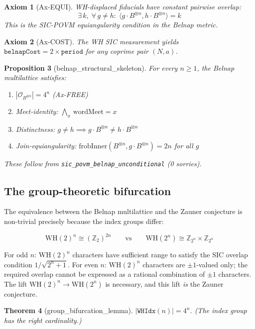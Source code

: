 \documentclass[12pt,a4paper]{article}
\newtheorem{theorem}{Theorem}[section]
\newtheorem{proposition}[theorem]{Proposition}
\newtheorem{axiom_env}[theorem]{Axiom}
\newcommand{\WH}{\mathrm{WH}}
\begin{document}
\begin{axiom_env}[Ax-EQUI]
WH-displaced fiducials have constant pairwise overlap:
\[
\exists\, k,\; \forall\, g \neq h:\; \langle g \cdot B^{\otimes n}, h \cdot B^{\otimes n}\rangle = k
\]
This is the SIC-POVM equiangularity condition in the Belnap metric.
\end{axiom_env}

\begin{axiom_env}[Ax-COST]
The WH SIC measurement yields $\texttt{belnapCost} = 2 \times \texttt{period}$
for any coprime pair $(N, a)$.
\end{axiom_env}

\begin{proposition}[belnap\_structural\_skeleton]
\label{prop:skeleton}
For every $n \geq 1$, the Belnap multilattice satisfies:
\begin{enumerate}[label=(\arabic*)]
  \item $|\mathcal{O}_{B^{\otimes n}}| = 4^n$ \quad (Ax-FREE)
  \item Meet-identity: $\bigwedge_{x}\, \mathrm{wordMeet} = x$
  \item Distinctness: $g \neq h \implies g \cdot B^{\otimes n} \neq h \cdot B^{\otimes n}$
  \item Join-equiangularity: $\mathrm{frobInner}(B^{\otimes n}, g \cdot B^{\otimes n}) = 2n$ for all $g$
\end{enumerate}
These follow from \texttt{sic\_povm\_belnap\_unconditional} (0 sorries).
\end{proposition}

\subsection{The group-theoretic bifurcation}

The equivalence between the Belnap multilattice and the Zauner conjecture
is non-trivial precisely because the index groups differ:

\[
\WH(2)^n \cong (\mathbb{Z}_2)^{2n}
\qquad\text{vs}\qquad
\WH(2^n) \cong \mathbb{Z}_{2^n} \times \mathbb{Z}_{2^n}
\]

For odd $n$: $\WH(2)^n$ characters have sufficient range to satisfy the
SIC overlap condition $1/\sqrt{2^n+1}$.
For even $n$: $\WH(2)^n$ characters are $\pm 1$-valued only; the required
overlap cannot be expressed as a rational combination of $\pm 1$ characters.
The lift $\WH(2)^n \to \WH(2^n)$ is necessary, and this lift \emph{is} the Zauner conjecture.

\begin{theorem}[group\_bifurcation\_lemma]
$|\texttt{WHIdx}(n)| = 4^n$.  (The index group has the right cardinality.)
\end{theorem}
\end{document}
